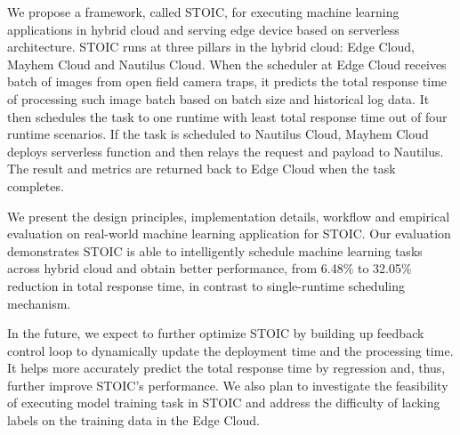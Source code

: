 We propose a framework, called STOIC, for executing machine learning applications in hybrid cloud and serving edge device based on serverless architecture. STOIC runs at three pillars in the hybrid cloud: Edge Cloud, Mayhem Cloud and Nautilus Cloud. When the scheduler at Edge Cloud receives batch of images from open field camera traps, it predicts the total response time of processing such image batch based on batch size and historical log data. It then schedules the task to one runtime with least total response time out of four runtime scenarios. If the task is scheduled to Nautilus Cloud, Mayhem Cloud deploys serverless function and then relays the request and payload to Nautilus. The result and metrics are returned back to Edge Cloud when the task completes.

We present the design principles, implementation details, workflow and empirical evaluation on real-world machine learning application for STOIC. Our evaluation demonstrates STOIC is able to intelligently schedule machine learning tasks across hybrid cloud and obtain better performance, from 6.48\% to 32.05\% reduction in total response time, in contrast to single-runtime scheduling mechanism.

In the future, we expect to further optimize STOIC by building up feedback control loop to dynamically update the deployment time and the processing time. It helps more accurately predict the total response time by regression and, thus, further improve STOIC's performance. We also plan to investigate the feasibility of executing model training task in STOIC and address the difficulty of lacking labels on the training data in the Edge Cloud.